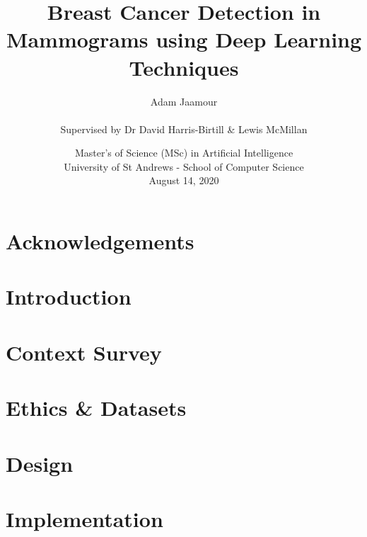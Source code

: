 \documentclass[11pt,oneside,a4paper]{report} %
\title{Breast Cancer Detection in Mammograms using Deep Learning Techniques}
\author{Adam Jaamour\\~\\Supervised by Dr David Harris-Birtill \& Lewis McMillan}
\date{Master's of Science (MSc) in Artificial Intelligence\\University of St Andrews - School of Computer Science\\August 14, 2020}
\begin{document}
\setcounter{page}{0}

\maketitle
\newpage

\newpage

\abstract

\newpage

\setcounter{tocdepth}{3}
\tableofcontents
\newpage
\listoffigures
\newpage
\listoftables
\newpage

\printnomenclature 
\newpage

\chapter*{Acknowledgements}

\newpage


\setcounter{page}{1}

\chapter{Introduction}
\label{ch:chapter-intro}


\chapter{Context Survey}
\label{ch:chapter-litsurvey}


\chapter{Ethics \& Datasets}
\label{ch:chapter-ethics-datasets}


\chapter{Design}
\label{ch:chapter-design}


\chapter{Implementation}
\label{ch:chapter-implementation}

\end{document}
